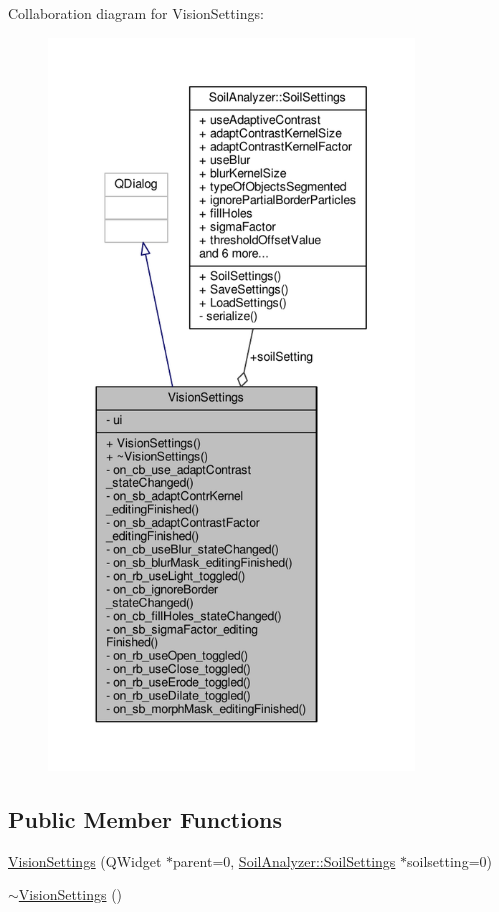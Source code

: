 Collaboration diagram for Vision\+Settings\+:\nopagebreak
\begin{figure}[H]
\begin{center}
\leavevmode
\includegraphics[height=550pt]{class_vision_settings__coll__graph}
\end{center}
\end{figure}
\subsection*{Public Member Functions}
\begin{DoxyCompactItemize}
\item 
\hyperlink{class_vision_settings_a9b8326f02adf7be4cf165520692fd24d}{Vision\+Settings} (Q\+Widget $\ast$parent=0, \hyperlink{class_soil_analyzer_1_1_soil_settings}{Soil\+Analyzer\+::\+Soil\+Settings} $\ast$soilsetting=0)
\item 
\hyperlink{class_vision_settings_a8deb448a840eeddce781f40dcf490fb9}{$\sim$\+Vision\+Settings} ()
\end{DoxyCompactItemize}

